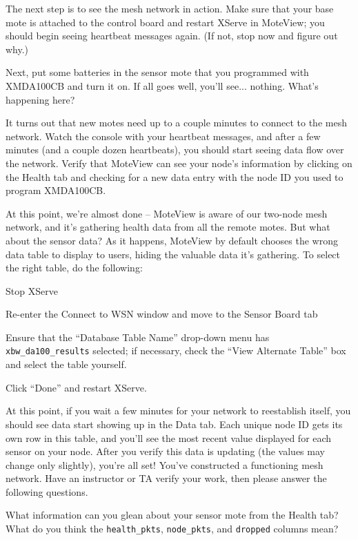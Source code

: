 \documentclass{article}
\begin{document}
The next step is to see the mesh network in action. Make sure that your base mote is attached to the control board and restart XServe in MoteView; you should begin seeing heartbeat messages again. (If not, stop now and figure out why.)

Next, put some batteries in the sensor mote that you programmed with XMDA100CB and turn it on. If all goes well, you'll see... nothing. What's happening here?

It turns out that new motes need up to a couple minutes to connect to the mesh network. Watch the console with your heartbeat messages, and after a few minutes (and a couple dozen heartbeats), you should start seeing data flow over the network. Verify that MoteView can see your node's information by clicking on the Health tab and checking for a new data entry with the node ID you used to program XMDA100CB.

At this point, we're almost done -- MoteView is aware of our two-node mesh network, and it's gathering health data from all the remote motes. But what about the sensor data? As it happens, MoteView by default chooses the wrong data table to display to users, hiding the valuable data it's gathering. To select the right table, do the following:

\begin{itemize*}
\item Stop XServe
\item Re-enter the Connect to WSN window and move to the Sensor Board tab
\item Ensure that the ``Database Table Name'' drop-down menu has \verb!xbw_da100_results! selected; if necessary, check the ``View Alternate Table'' box and select the table yourself.
\item Click ``Done'' and restart XServe.
\end{itemize*}

At this point, if you wait a few minutes for your network to reestablish itself, you should see data start showing up in the Data tab. Each unique node ID gets its own row in this table, and you'll see the most recent value displayed for each sensor on your node. After you verify this data is updating (the values may change only slightly), you're all set! You've constructed a functioning mesh network. Have an instructor or TA verify your work, then please answer the following questions.

 What information can you glean about your sensor mote from the Health tab? What do you think the \verb!health_pkts!, \verb!node_pkts!, and \verb!dropped! columns mean?
\end{document}
